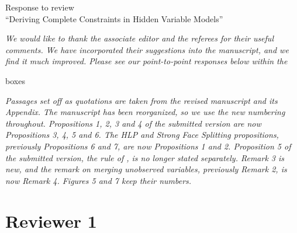 \documentclass{article}
\begin{document}
\begin{center}
{\Large Response to review}\\[0.5em]
``Deriving Complete Constraints in Hidden Variable Models''
\end{center}

\vspace{-0.5cm}
{\sl We would like to thank the associate editor and the referees for their useful comments. We have incorporated their suggestions into the manuscript, and we find it much improved. Please see our point-to-point responses below within the

\begin{mdframed} boxes \end{mdframed}}

{\sl Passages set off as quotations are taken from the revised manuscript and its Appendix. The manuscript has been reorganized, so we use the new numbering throughout. Propositions 1, 2, 3 and 4 of the submitted version are now Propositions 3, 4, 5 and 6. The HLP and Strong Face Splitting propositions, previously Propositions 6 and 7, are now Propositions 1 and 2. Proposition 5 of the submitted version, the rule of \citet{evans2016graphs}, is no longer stated separately. Remark 3 is new, and the remark on merging unobserved variables, previously Remark 2, is now Remark 4. Figures 5 and 7 keep their numbers.}

\section*{Reviewer 1}
\end{document}
